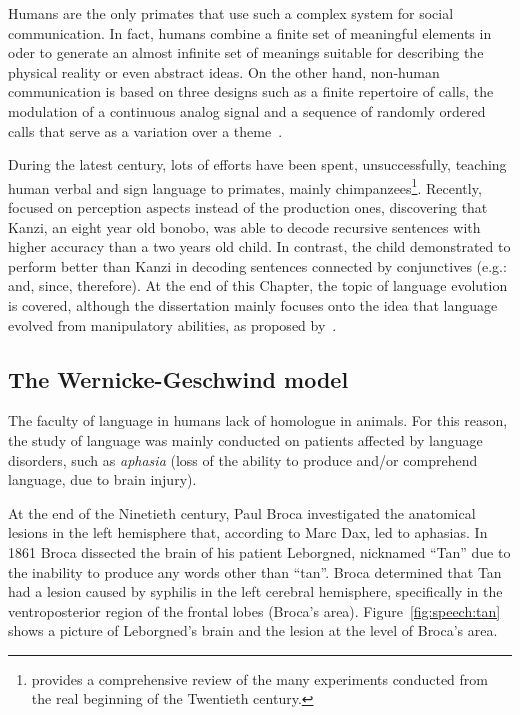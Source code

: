 Humans are the only primates that use such a complex system for social
communication. 
In fact, humans combine a finite set of meaningful elements in oder to generate
an almost infinite set of meanings suitable for describing the physical reality
or even abstract ideas.
On the other hand, non-human communication is based on three designs such as 
a finite repertoire of calls, the modulation of a continuous analog signal and 
a sequence of randomly ordered calls that serve as a variation over a
theme~\citep{kandel.schwartz.jessel:2000}.

During the latest century, lots of efforts have been spent, unsuccessfully, 
teaching human verbal and sign language to primates, mainly 
chimpanzees\footnote{
\citet{marcus:2004} provides a comprehensive review of the many experiments 
conducted from the real beginning of the Twentieth century.}.
Recently, \citet{savage-rumbaugh.etal:1993} focused on perception aspects 
instead of the production ones, discovering that Kanzi, an eight year old
bonobo, was able to decode recursive sentences with higher accuracy than a
two years old child. 
In contrast, the child demonstrated to perform better than Kanzi in decoding
sentences connected by conjunctives (e.g.: and, since, therefore).
At the end of this Chapter, the topic of language evolution is covered,
although the dissertation mainly focuses onto the idea that language evolved
from manipulatory abilities, as proposed
by~\citet{rizzolatti.arbib:1998}.
\subsection{The Wernicke-Geschwind model}
\label{sec:speech:language:wg}
The faculty of language in humans lack of homologue in animals.
For this reason, the study of language was mainly conducted on patients affected
by language disorders, such as \emph{aphasia} (loss of the ability to produce 
and/or comprehend language, due to brain injury).


At the end of the Ninetieth century, Paul Broca investigated the anatomical
lesions in the left hemisphere that, according to Marc Dax, led to aphasias.
In 1861 Broca dissected the brain of his patient Leborgned, nicknamed ``Tan''
due to the inability to produce any words other than ``tan''.
Broca determined that Tan had a lesion caused by syphilis in the left cerebral
hemisphere, specifically in the ventroposterior region of the frontal lobes
(Broca's area). Figure~\ref{fig:speech:tan} shows a picture of Leborgned's brain
and the lesion at the level of Broca's area.

